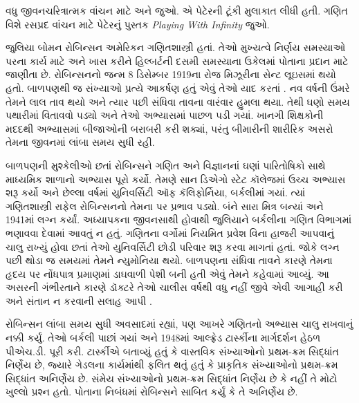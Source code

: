 \begin{reading}
વધુ જીવનચરિત્રાત્મક વાંચન માટે
\citep{Oconnor2014} અને
\citep{Andrasfai1986} જુઓ.
\citet{Tamassy1994}એ પેટેરની
ટૂંકી મુલાકાત લીધી હતી.
ગણિત વિશે રસપ્રદ વાંચન
માટે પેટેરનું પુસ્તક
\emph{Playing With Infinity}
\citep{Peter2010} જુઓ.
\end{reading}
\endgroup


\begingroup
\makeatletter{}\makeatother


\label{guunit:OLP-0628}



જુલિયા બોમન રોબિન્સન અમેરિકન ગણિતશાસ્ત્રી
હતાં. તેઓ મુખ્યત્વે નિર્ણય સમસ્યાઓ પરના
કાર્ય માટે અને ખાસ કરીને હિલ્બર્ટની
દસમી સમસ્યાના ઉકેલમાં પોતાના પ્રદાન
માટે જાણીતા છે. રોબિન્સનનો જન્મ
8 ડિસેમ્બર 1919ના રોજ મિઝૂરીના
સેન્ટ લૂઇસમાં થયો હતો. બાળપણથી જ
સંખ્યાઓ પ્રત્યે આકર્ષણ હતું એવું
તેઓ યાદ કરતાં \citep[4]{Reid1986}.
નવ વર્ષની ઉંમરે તેમને લાલ તાવ
થયો અને ત્યાર પછી સંધિવા તાવના
વારંવાર હુમલા થયા. તેથી ઘણો
સમય પથારીમાં વિતાવવો પડ્યો અને
તેઓ અભ્યાસમાં પાછળ પડી ગયાં.
ખાનગી શિક્ષકોની મદદથી અભ્યાસમાં
બીજાઓની બરાબરી કરી શક્યાં,
પરંતુ બીમારીની શારીરિક અસરો
તેમના જીવનમાં લાંબા સમય
સુધી રહી.

બાળપણની મુશ્કેલીઓ છતાં
રોબિન્સને ગણિત અને વિજ્ઞાનનાં
ઘણાં પારિતોષિકો સાથે માધ્યમિક
શાળાનો અભ્યાસ પૂરો કર્યો.
તેમણે સાન ડિએગો સ્ટેટ કૉલેજમાં
ઉચ્ચ અભ્યાસ શરૂ કર્યો અને
છેલ્લા વર્ષમાં યુનિવર્સિટી ઑફ
કૅલિફોર્નિયા, બર્કલીમાં ગયાં.
ત્યાં ગણિતશાસ્ત્રી રાફેલ
રોબિન્સનનો તેમના પર પ્રભાવ
પડ્યો. બંને સારા મિત્ર બન્યાં
અને 1941માં લગ્ન કર્યાં.
અધ્યાપકના જીવનસાથી હોવાથી
જુલિયાને બર્કલીના ગણિત
વિભાગમાં ભણાવવા દેવામાં
આવતું ન હતું. ગણિતના
વર્ગોમાં નિયમિત પ્રવેશ વિના
હાજરી આપવાનું ચાલુ રાખ્યું
હોવા છતાં તેઓ યુનિવર્સિટી
છોડી પરિવાર શરૂ કરવા માગતાં
હતાં. જોકે લગ્ન પછી થોડા
જ સમયમાં તેમને ન્યુમોનિયા
થયો. બાળપણના સંધિવા
તાવને કારણે તેમના હૃદય
પર નોંધપાત્ર પ્રમાણમાં
ડાઘવાળી પેશી બની હતી એવું તેમને
કહેવામાં આવ્યું. આ
અસરની ગંભીરતાને કારણે
ડૉક્ટરે તેઓ ચાલીસ વર્ષથી
વધુ નહીં જીવે એવી આગાહી
કરી અને સંતાન ન કરવાની
સલાહ આપી \citep[13]{Reid1986}.

રોબિન્સન લાંબા સમય સુધી
અવસાદમાં રહ્યાં, પણ આખરે
ગણિતનો અભ્યાસ ચાલુ રાખવાનું
નક્કી કર્યું. તેઓ બર્કલી
પાછાં ગયાં અને 1948માં
આલ્ફ્રેડ ટાર્સ્કીના માર્ગદર્શન
હેઠળ પીએચ.ડી. પૂરી કરી.
ટાર્સ્કીએ બતાવ્યું હતું કે
વાસ્તવિક સંખ્યાઓનો પ્રથમ-ક્રમ
સિદ્ધાંત નિર્ણેય છે, જ્યારે
ગેડલના કાર્યમાંથી ફલિત થતું
હતું કે પ્રાકૃતિક સંખ્યાઓનો
પ્રથમ-ક્રમ સિદ્ધાંત અનિર્ણેય
છે. સંમેય સંખ્યાઓનો પ્રથમ-ક્રમ
સિદ્ધાંત નિર્ણેય છે કે નહીં
તે મોટો ખુલ્લો પ્રશ્ન હતો.
પોતાના નિબંધમાં
\citeyearpar{Robinson1949}
રોબિન્સને સાબિત કર્યું કે
તે અનિર્ણેય છે.

